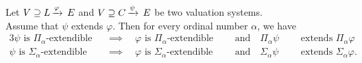 \documentclass[main.tex]{subfiles}
\begin{document}
%
%
\begin{lem}
\label{L:alpha-monotonous}
Let $V \supseteq L\,\smash{\xrightarrow{\varphi}\,E}$
and $V \supseteq C\,\smash{\xrightarrow{\psi}\,E}$
 be two valuation systems.\\
Assume  that
$\psi$ extends $\varphi$.
Then for every ordinal number $\alpha$, we have
\begin{alignat*}{3}
\text{$\psi$ is $\Pi_\alpha$-extendible}
\quad&\implies\quad
\text{$\varphi$ is $\Pi_\alpha$-extendible}
\quad&&\text{and}\quad
\text{$\Pi_\alpha\psi$ }&&\text{extends $\Pi_\alpha\varphi$} \\
\text{$\psi$ is $\Sigma_\alpha$-extendible}
\quad&\implies\quad
\text{$\varphi$ is $\Sigma_\alpha$-extendible}
\quad&&\text{and}\quad
\text{$\Sigma_\alpha\psi$ }&&\text{extends $\Sigma_\alpha\varphi$.}
\end{alignat*}
\end{lem}
\end{document}
